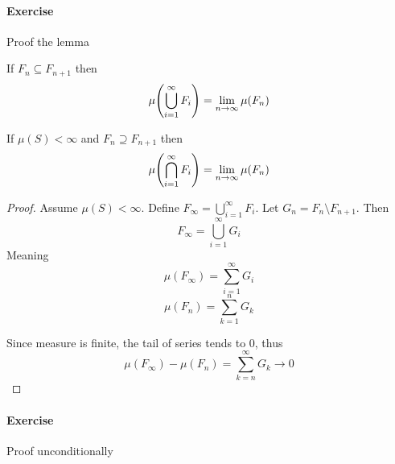 \paragraph{Exercise}
Proof the lemma

\begin{lemma}
	If $F_n \subseteq F_{n+1}$ then
	$$\mu\qty(\bigcup_{i=1}^\infty F_i) = \lim_{n\to \infty} \mu(F_n)$$
	
	
	If $\mu(S) < \infty$ and $F_n \supseteq F_{n+1}$ then
	$$\mu\qty(\bigcap_{i=1}^\infty F_i) = \lim_{n\to \infty} \mu(F_n)$$
\end{lemma}
\begin{proof}
	Assume $\mu(S) < \infty$.  Define 
	$F_\infty = \bigcup_{i=1}^\infty F_i$.
	Let $G_n = F_{n}\setminus F_{n+1}$. Then
	$$F_\infty = \bigcup_{i=1}^\infty G_i$$
	Meaning 
	$$\mu(F_\infty) =\sum_{i=1}^\infty G_i$$
	$$\mu(F_n) =\sum_{k=1}^n G_k$$
	
	Since measure is finite, the tail of series tends to $0$, thus 
	$$\mu(F_\infty) - \mu(F_n) = \sum_{k=n}^\infty G_k \to 0$$
\end{proof}

\paragraph{Exercise}
Proof unconditionally